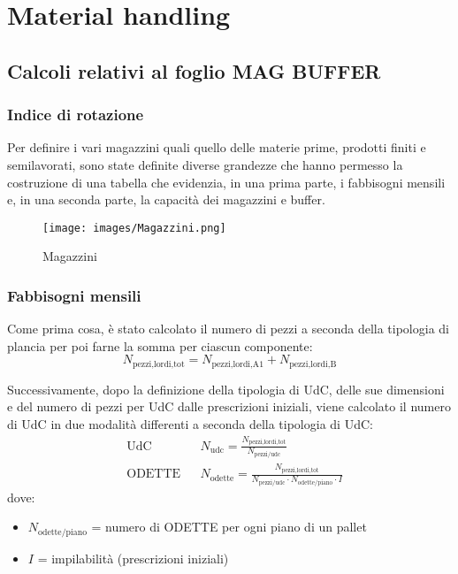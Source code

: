 \documentclass[11pt]{article}
\begin{document}
\section{Material handling}
\subsection{Calcoli relativi al foglio MAG BUFFER}
\subsubsection{Indice di rotazione}
Per definire i vari magazzini quali quello delle materie prime, prodotti finiti e semilavorati, sono state definite diverse grandezze che hanno permesso la costruzione di una tabella che evidenzia, in una prima parte, i fabbisogni mensili e, in una seconda parte, la capacità dei magazzini e buffer.
\begin{figure} [H]
    \centering
    \texttt{[image: images/Magazzini.png]}
    \caption{Magazzini}
    \label{fig: Magazzini}
\end{figure}

\subsubsection{Fabbisogni mensili}
Come prima cosa, è stato calcolato il numero di pezzi a seconda della tipologia di plancia per poi farne la somma per ciascun componente:
\begin{equation}
    N_\text{pezzi,lordi,tot} = N_\text{pezzi,lordi,A1} + N_\text{pezzi,lordi,B}
\end{equation}

Successivamente, dopo la definizione della tipologia di UdC, delle sue dimensioni e del numero di pezzi per UdC dalle prescrizioni iniziali, viene calcolato il numero di UdC in due modalità differenti a seconda della tipologia di UdC:
\begin{align}
    & \text{UdC} 
    && N_\text{udc} = \frac{N_\text{pezzi,lordi,tot}}{N_\text{pezzi/udc}} 
    \\
    & \text{ODETTE} 
    && N_\text{odette} = \frac{N_\text{pezzi,lordi,tot}}{N_\text{pezzi/udc}\cdot N_\text{odette/piano}\cdot I }
\end{align}
dove:
\begin{itemize}
    \item $N_\text{odette/piano}$ = numero di ODETTE per ogni piano di un pallet
    \item $I$ = impilabilità (prescrizioni iniziali)
\end{itemize}
\end{document}
